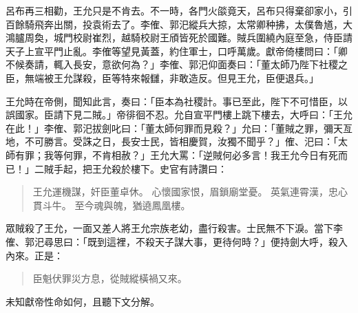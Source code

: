 呂布再三相勸，王允只是不肯去。不一時，各門火燄竟天，呂布只得棄卻家小，引百餘騎飛奔出關，投袁術去了。李傕、郭汜縱兵大掠，太常卿种拂，太僕魯馗，大鴻臚周奐，城門校尉崔烈，越騎校尉王頎皆死於國難。賊兵圍繞內庭至急，侍臣請天子上宣平門止亂。李傕等望見黃蓋，約住軍士，口呼萬歲。獻帝倚樓問曰：「卿不候奏請，輒入長安，意欲何為？」李傕、郭汜仰面奏曰：「董太師乃陛下社稷之臣，無端被王允謀殺，臣等特來報讎，非敢造反。但見王允，臣便退兵。」

王允時在帝側，聞知此言，奏曰：「臣本為社稷計。事已至此，陛下不可惜臣，以誤國家。臣請下見二賊。」帝徘徊不忍。允自宣平門樓上跳下樓去，大呼曰：「王允在此！」李傕、郭汜拔劍叱曰：「董太師何罪而見殺？」允曰：「董賊之罪，彌天亙地，不可勝言。受誅之日，長安士民，皆相慶賀，汝獨不聞乎？」傕、汜曰：「太師有罪；我等何罪，不肯相赦？」王允大罵：「逆賊何必多言！我王允今日有死而已！」二賊手起，把王允殺於樓下。史官有詩讚曰：

\begin{quote}
王允運機謀，奸臣董卓休。
心懷國家恨，眉鎖廟堂憂。
英氣連霄漢，忠心貫斗牛。
至今魂與魄，猶遶鳳凰樓。
\end{quote}

眾賊殺了王允，一面又差人將王允宗族老幼，盡行殺害。士民無不下淚。當下李傕、郭汜尋思曰：「既到這裡，不殺天子謀大事，更待何時？」便持劍大呼，殺入內來。正是：

\begin{quote}
臣魁伏罪災方息，從賊縱橫禍又來。
\end{quote}

未知獻帝性命如何，且聽下文分解。
